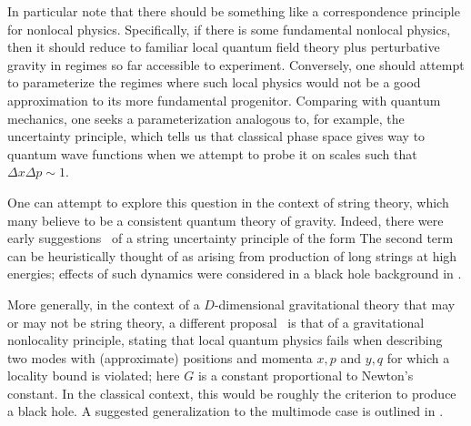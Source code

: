 In particular note that there should be something like a correspondence principle for nonlocal physics.  Specifically, if there  is some fundamental nonlocal physics, then it should reduce to familiar local quantum field theory plus perturbative gravity in regimes so far accessible to experiment.  Conversely, one should attempt to parameterize the regimes where such local physics would not be a good approximation to its more fundamental progenitor.  Comparing with quantum mechanics, one seeks a parameterization analogous to, for example, the uncertainty principle, which tells us that classical phase space gives way to quantum wave functions when we attempt to probe it on scales such that $\Delta x\Delta p\sim 1$.  

One can attempt to explore this question in the context of string theory, which many believe to be a consistent quantum theory of gravity.  Indeed, there were early suggestions~ of a  string uncertainty principle of the form 
%
\eqn{}
%
The second term can be heuristically thought of as arising from production of long strings at high energies; effects of such dynamics were considered in a black hole background  in .

More generally, in the context of a $D$-dimensional gravitational theory that may or may not be string theory, a different proposal~  is that of a  gravitational nonlocality principle, stating that local quantum physics fails when describing two modes with (approximate) positions and momenta $x,p$ and $y,q$ for which a locality bound 
%
\eqn{}
%
is violated; here $G$ is a constant proportional to Newton's constant.  In the classical context, this would be roughly the criterion to produce a black hole.  A suggested generalization to the multimode case is outlined in .

